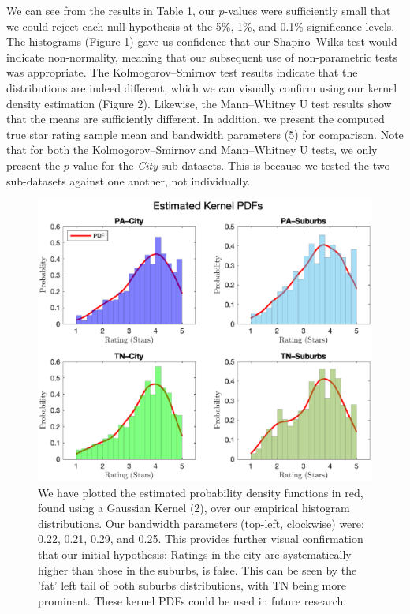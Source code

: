 \documentclass{article}
\begin{document}
We can see from the results in Table 1, our $p$-values were sufficiently small that we could reject each null hypothesis at the 5\%, 1\%, and 0.1\% significance levels. The histograms (Figure 1) gave us confidence that our Shapiro–Wilks test would indicate non-normality, meaning that our subsequent use of non-parametric tests was appropriate. The Kolmogorov–Smirnov test results indicate that the distributions are indeed different, which we can visually confirm using our kernel density estimation (Figure 2). Likewise, the Mann–Whitney U test results show that the means are sufficiently different. In addition, we present the computed true star rating sample mean and bandwidth parameters (5) for comparison. Note that for both the Kolmogorov–Smirnov and Mann–Whitney U tests, we only present the $p$-value for the \textit{City} sub-datasets. This is because we tested the two sub-datasets against one another, not individually.

\begin{figure}[t]
    \centering
    \includegraphics[trim={0 0 0 1cm},clip,width=\textwidth]{kerneldensity.eps}
    \caption{We have plotted the estimated probability density functions in red, found using a Gaussian Kernel (2), over our empirical histogram distributions. Our bandwidth parameters (top-left, clockwise) were: 0.22, 0.21, 0.29, and 0.25. This provides further visual confirmation that our initial hypothesis: Ratings in the city are systematically higher than those in the suburbs, is false. This can be seen by the 'fat' left tail of both suburbs distributions, with TN being more prominent. These kernel PDFs could be used in future research.}
    \label{fig:2}
\end{figure}
\end{document}
